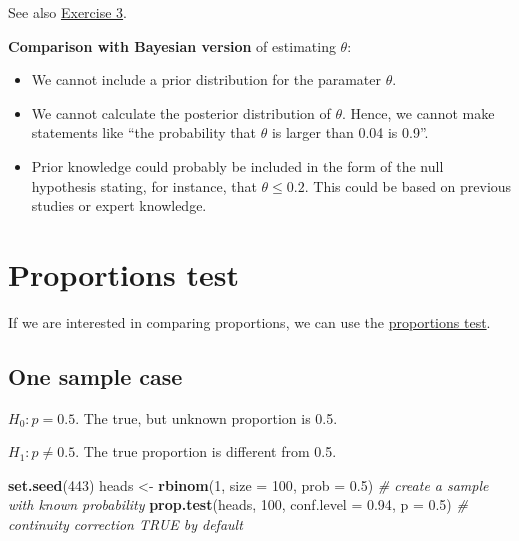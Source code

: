 \documentclass[
]{book}
\newenvironment{Shaded}{\begin{snugshade}}{\end{snugshade}}
\newcommand{\AttributeTok}[1]{\textcolor[rgb]{0.13,0.29,0.53}{#1}}
\newcommand{\CommentTok}[1]{\textcolor[rgb]{0.56,0.35,0.01}{\textit{#1}}}
\newcommand{\DecValTok}[1]{\textcolor[rgb]{0.00,0.00,0.81}{#1}}
\newcommand{\FloatTok}[1]{\textcolor[rgb]{0.00,0.00,0.81}{#1}}
\newcommand{\FunctionTok}[1]{\textcolor[rgb]{0.13,0.29,0.53}{\textbf{#1}}}
\newcommand{\NormalTok}[1]{#1}
\newcommand{\OtherTok}[1]{\textcolor[rgb]{0.56,0.35,0.01}{#1}}
\providecommand{\tightlist}{%
  \setlength{\itemsep}{0pt}\setlength{\parskip}{0pt}}
\begin{document}
See also \hyperref[exercise3_nhst]{Exercise 3}.

\textbf{Comparison with Bayesian version} of estimating \(\theta\):

\begin{itemize}
\tightlist
\item
  We cannot include a prior distribution for the paramater \(\theta\).
\item
  We cannot calculate the posterior distribution of \(\theta\).
  Hence, we cannot make statements like ``the probability that \(\theta\) is larger than 0.04 is 0.9''.
\item
  Prior knowledge could probably be included in the form of the null hypothesis stating, for instance, that \(\theta \le 0.2\).
  This could be based on previous studies or expert knowledge.
\end{itemize}

\section{Proportions test}\label{proportions-test}

If we are interested in comparing proportions,
we can use the \href{https://www.rdocumentation.org/packages/stats/versions/3.6.2/topics/prop.test}{proportions test}.

\subsection{One sample case}\label{one-sample-case}

\(H_0: p = 0.5\). The true, but unknown proportion is 0.5.

\(H_1: p \ne 0.5\). The true proportion is different from 0.5.

\begin{Shaded}
\begin{Highlighting}[]
\FunctionTok{set.seed}\NormalTok{(}\DecValTok{443}\NormalTok{)}
\NormalTok{heads }\OtherTok{\textless{}{-}} \FunctionTok{rbinom}\NormalTok{(}\DecValTok{1}\NormalTok{, }\AttributeTok{size =} \DecValTok{100}\NormalTok{,}
                \AttributeTok{prob =} \FloatTok{0.5}\NormalTok{) }\CommentTok{\# create a sample with known probability}
\FunctionTok{prop.test}\NormalTok{(heads, }\DecValTok{100}\NormalTok{,}
          \AttributeTok{conf.level =} \FloatTok{0.94}\NormalTok{, }\AttributeTok{p =} \FloatTok{0.5}\NormalTok{) }\CommentTok{\# continuity correction TRUE by default}
\end{Highlighting}
\end{Shaded}
\end{document}
